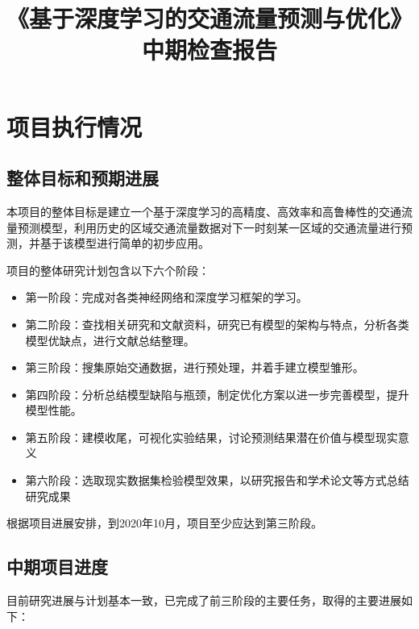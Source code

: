 \documentclass[UTF8]{ctexart}
\title{《基于深度学习的交通流量预测与优化》\\中期检查报告}
\author{}
\numberwithin{equation}{section}
\begin{document}
\maketitle

\newpage
\setcounter{page}{1}


\section{项目执行情况}
	\subsection{整体目标和预期进展}
本项目的整体目标是建立一个基于深度学习的高精度、高效率和高鲁棒性的交通流量预测模型，利用历史的区域交通流量数据对下一时刻某一区域的交通流量进行预测，并基于该模型进行简单的初步应用。

项目的整体研究计划包含以下六个阶段：

\begin{itemize}
	\item
	第一阶段：完成对各类神经网络和深度学习框架的学习。
	\item
	第二阶段：查找相关研究和文献资料，研究已有模型的架构与特点，分析各类模型优缺点，进行文献总结整理。
	\item
	第三阶段：搜集原始交通数据，进行预处理，并着手建立模型雏形。
	\item
	第四阶段：分析总结模型缺陷与瓶颈，制定优化方案以进一步完善模型，提升模型性能。
	\item
	第五阶段：建模收尾，可视化实验结果，讨论预测结果潜在价值与模型现实意义
	\item
	第六阶段：选取现实数据集检验模型效果，以研究报告和学术论文等方式总结研究成果
\end{itemize}

根据项目进展安排，到2020年10月，项目至少应达到第三阶段。

	\subsection{中期项目进度}
目前研究进展与计划基本一致，已完成了前三阶段的主要任务，取得的主要进展如下：
\end{document}
